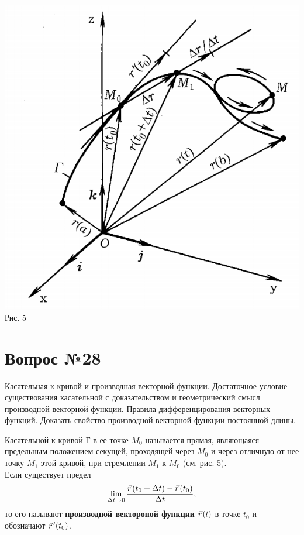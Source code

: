 \documentclass[12pt]{report}
\numberwithin{equation}{section}
\newcommand{\pvec}[1]{\vec{#1}\mkern2mu\vphantom{#1}}
\begin{document}
\begin{center}
\includegraphics[scale=0.4]{pic27_1.png} \label{pic:27:1}\\
Рис. 5
\end{center}

\newpage \section{Вопрос №28} %
\begin{framed}
Касательная к кривой и производная векторной функции. Достаточное условие существования касательной с доказательством и геометрический смысл производной векторной функции. Правила дифференцирования векторных функций. Доказать свойство производной векторной функции постоянной длины.
\end{framed}
Касательной к кривой Г в ее точке $M_0$ называется прямая, являющаяся предельным положением секущей, проходящей через $M_0$ и через отличную от нее точку $M_1$ этой кривой, при стремлении $M_1$ к $M_0$ (см. \hyperref[pic:27:1]{рис. 5}).\\

Если существует предел
\[ \lim_{\Delta t \to 0} \frac{\pvec{r}(t_0 + \Delta t) - \pvec{r}(t_0)}{\Delta t},\]
то его называют \textbf{производной вектороной функции} $\pvec{r}(t)$ в точке $t_0$ и обозначают $\pvec{r}'(t_0)$.
\end{document}
